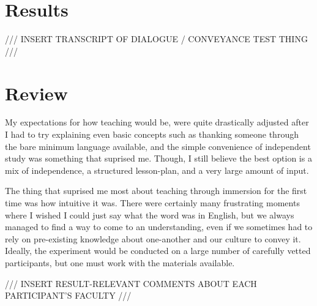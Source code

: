 \documentclass[a4paper,10pt]{article}
\begin{document}
\section{Results}

/// INSERT TRANSCRIPT OF DIALOGUE / CONVEYANCE TEST THING ///

\section{Review}
My expectations for how teaching would be, were quite drastically adjusted after I had to try explaining
even basic concepts such as thanking someone through the bare minimum language available, and the
simple convenience of independent study was something that suprised me. Though, I still believe the
best option is a mix of independence, a structured lesson-plan, and a very large amount of input.

The thing that suprised me most about teaching through immersion for the first time was how intuitive
it was. There were certainly many frustrating moments where I wished I could just say what the word
was in English, but we always managed to find a way to come to an understanding, even if we sometimes
had to rely on pre-existing knowledge about one-another and our culture to convey it. Ideally, the
experiment would be conducted on a large number of carefully vetted participants, but one must work with
the materials available.

/// INSERT RESULT-RELEVANT COMMENTS ABOUT EACH PARTICIPANT'S FACULTY ///
\end{document}
